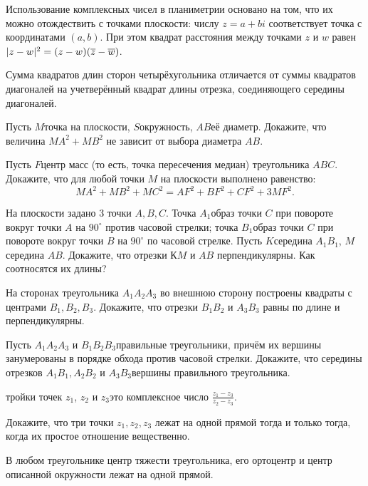 \documentclass[a4paper,12pt]{article}
\begin{document}

{
\small
Использование комплексных чисел в планиметрии основано на том, что их можно отождествить с точками плоскости: числу $z=a+bi$ соответствует точка с координатами $(a,b)$. При этом квадрат расстояния между точками $z$ и $w$ равен $|z-w|^2=(z-w)(\overline z - \overline w)$.
}

\medskip

Сумма квадратов длин сторон четырёхугольника отличается от суммы квадратов диагоналей на учетверённый квадрат длины отрезка, соединяющего середины диагоналей.

Пусть $M$\т точка на плоскости, $S$\т окружность, $AB$\т её диаметр. Докажите, что величина $MA^2 + MB^2$ не зависит от выбора диаметра $AB$.

Пусть $F$\т центр масс (то есть, точка пересечения медиан) треугольника $ABC$. Докажите, что для любой точки $M$ на плоскости выполнено равенство:
\vskip -2mm
$$
MA^2+MB^2+MC^2=AF^2+BF^2+CF^2+3MF^2.
$$
\vskip -3mm

На плоскости задано 3 точки $A,B,C$. Точка $A_1$\т образ точки $C$ при повороте вокруг точки $A$ на $90^{\circ}$ против часовой стрелки; точка $B_1$\т образ точки $C$ при повороте вокруг точки $B$ на $90^{\circ}$ по часовой стрелке. Пусть $K$\т середина $A_1B_1$, $M$\т середина $AB$. Докажите, что отрезки $КM$ и $AB$ перпендикулярны. Как соотносятся их длины?

На сторонах треугольника $A_1A_2A_3$ во внешнюю сторону построены квадраты с центрами $B_1, B_2, B_3$. Докажите, что отрезки $B_1B_2$ и $A_3B_3$ равны по длине и перпендикулярны.

Пусть $A_1A_2A_3$ и $B_1B_2B_3$\т правильные треугольники, причём их вершины занумерованы в порядке обхода против часовой стрелки. Докажите, что середины отрезков $A_1B_1, A_2B_2$ и $A_3B_3$\т вершины правильного треугольника.

 тройки точек $z_1$, $z_2$ и $z_3$\т это комплексное число $\displaystyle\frac{z_1-z_3}{z_2-z_3}$.

Докажите, что три точки $z_1,z_2,z_3$ лежат на одной прямой тогда и только тогда, когда их простое отношение вещественно.

В любом треугольнике центр тяжести треугольника, его ортоцентр и центр описанной окружности лежат на одной прямой.
\end{document}

